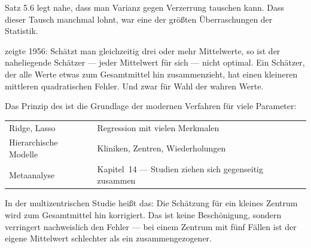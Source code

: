 \begin{forschung}
Satz 5.6 legt nahe, dass man Varianz gegen Verzerrung tauschen kann. Dass dieser Tausch manchmal  lohnt, war eine der größten Überraschungen der Statistik.

 zeigte 1956: Schätzt man gleichzeitig drei oder mehr Mittelwerte, so ist der naheliegende Schätzer --- jeder Mittelwert für sich --- nicht optimal. Ein Schätzer, der alle Werte etwas zum Gesamtmittel hin zusammenzieht, hat einen kleineren mittleren quadratischen Fehler. Und zwar für  Wahl der wahren Werte.

\begin{center}
\begin{minipage}{0.88\textwidth}
\end{minipage}
\end{center}

Das Prinzip des  ist die Grundlage der modernen Verfahren für viele Parameter:

\begin{center}
{\small
\renewcommand{\arraystretch}{1.45}
\begin{tabular}{@{}P{2.8cm}P{5.4cm}@{}}
\toprule
Ridge, Lasso & Regression mit vielen Merkmalen\\
Hierarchische Modelle & Kliniken, Zentren, Wiederholungen\\
Metaanalyse & Kapitel~14 --- Studien ziehen sich gegenseitig zusammen\\
\bottomrule
\end{tabular}}
\end{center}

In der multizentrischen Studie heißt das: Die Schätzung für ein kleines Zentrum wird zum Gesamtmittel hin korrigiert. Das ist keine Beschönigung, sondern verringert nachweislich den Fehler --- bei einem Zentrum mit fünf Fällen ist der eigene Mittelwert schlechter als ein zusammengezogener.
\end{forschung}

